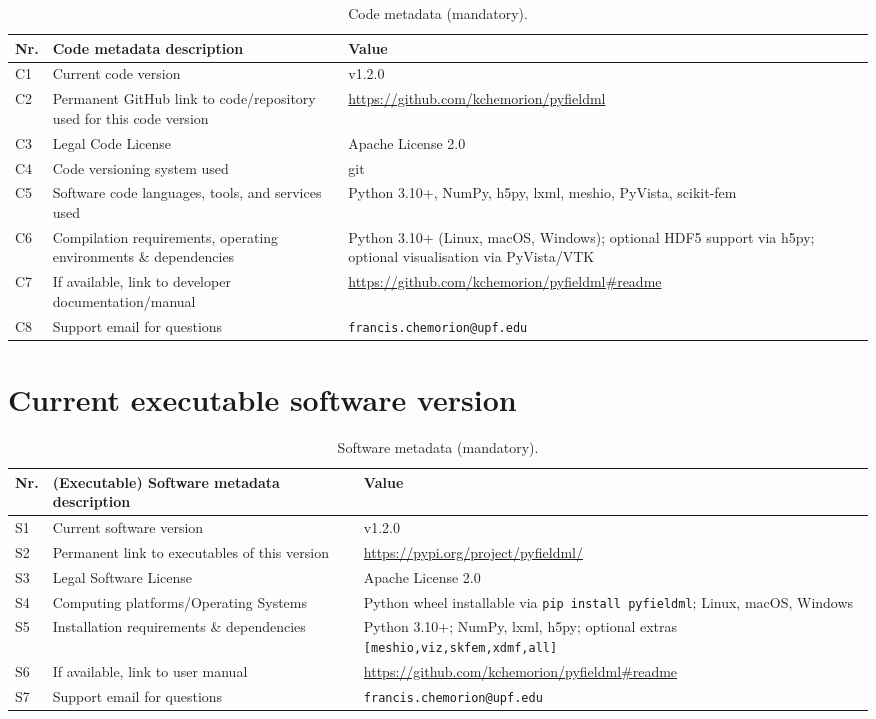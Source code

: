 \documentclass[preprint,12pt,a4paper]{elsarticle}
\begin{document}
\begin{table}[!h]
\small
\begin{tabular}{|l|p{5.0cm}|p{6.5cm}|}
\hline
\textbf{Nr.} & \textbf{Code metadata description} & \textbf{Value} \\
\hline
C1 & Current code version & v1.2.0 \\
\hline
C2 & Permanent GitHub link to code/repository used for this code version & \url{https://github.com/kchemorion/pyfieldml} \\
\hline
C3 & Legal Code License & Apache License 2.0 \\
\hline
C4 & Code versioning system used & git \\
\hline
C5 & Software code languages, tools, and services used & Python 3.10+, NumPy, h5py, lxml, meshio, PyVista, scikit-fem \\
\hline
C6 & Compilation requirements, operating environments \& dependencies & Python 3.10+ (Linux, macOS, Windows); optional HDF5 support via h5py; optional visualisation via PyVista/VTK \\
\hline
C7 & If available, link to developer documentation/manual & \url{https://github.com/kchemorion/pyfieldml\#readme} \\
\hline
C8 & Support email for questions & \texttt{francis.chemorion@upf.edu} \\
\hline
\end{tabular}
\caption{Code metadata (mandatory).}
\label{tab:codemeta}
\end{table}

\section*{Current executable software version}

\begin{table}[!h]
\small
\begin{tabular}{|l|p{5.0cm}|p{6.5cm}|}
\hline
\textbf{Nr.} & \textbf{(Executable) Software metadata description} & \textbf{Value} \\
\hline
S1 & Current software version & v1.2.0 \\
\hline
S2 & Permanent link to executables of this version & \url{https://pypi.org/project/pyfieldml/} \\
\hline
S3 & Legal Software License & Apache License 2.0 \\
\hline
S4 & Computing platforms/Operating Systems & Python wheel installable via \texttt{pip install pyfieldml}; Linux, macOS, Windows \\
\hline
S5 & Installation requirements \& dependencies & Python 3.10+; NumPy, lxml, h5py; optional extras \texttt{[meshio,viz,skfem,xdmf,all]} \\
\hline
S6 & If available, link to user manual & \url{https://github.com/kchemorion/pyfieldml\#readme} \\
\hline
S7 & Support email for questions & \texttt{francis.chemorion@upf.edu} \\
\hline
\end{tabular}
\caption{Software metadata (mandatory).}
\label{tab:execmeta}
\end{table}
\end{document}
